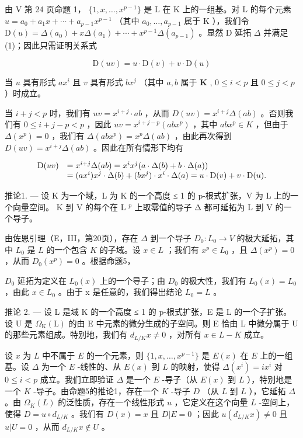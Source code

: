 由 V 第 24 页命题 1， \(\{1, x, \ldots, x^{p-1}\}\) 是 L 在 K 上的一组基。对 L 的每个元素 \(u = a_{0} + a_{1}x + \cdots + a_{p-1}x^{p-1}\) （其中 \(a_{0}, \ldots, a_{p-1}\) 属于 K ），我们令 \(\mathrm{D}(u) = \Delta(a_{0}) + x\Delta(a_{1}) + \cdots + x^{p-1}\Delta(a_{p-1})\) 。显然 D 延拓 \(\Delta\) 并满足 (1)；因此只需证明关系式

\[
\mathrm{D} (u v) = u \cdot \mathrm{D} (v) + v \cdot \mathrm{D} (u)
\]

当 \(u\) 具有形式 \(ax^i\) 且 \(v\) 具有形式 \(bx^j\) （其中 \(a, b\) 属于 \(\mathbf{K}\) , \(0 \leqslant i < p\) 且 \(0 \leqslant j < p\) ）时成立。

当 \(i + j < p\) 时，我们有 \(uv = x^{i + j} \cdot ab\) ，从而 \(D(uv) = x^{i + j}\Delta(ab)\) 。否则我们有 \(0 \leqslant i + j - p < p\) ，因此 \(uv = x^{i + j - p}(abx^p)\) ，其中 \(abx^p \in K\) ，但由于 \(\Delta(x^p) = 0\) ，我们有 \(\Delta(abx^p) = x^p\Delta(ab)\) ，由此再次得到 \(D(uv) = x^{i + j}\Delta(ab)\) 。因此在所有情形下均有

\[
\begin{array}{r l} \mathrm{D} (u v) & = x ^ {i + j} \Delta (a b) = x ^ {i} x ^ {j} (a \cdot \Delta (b) + b \cdot \Delta (a)) \\ & = (a x ^ {i}) x ^ {j} \cdot \Delta (b) + (b x ^ {j}) \cdot x ^ {i} \cdot \Delta (a) = u \cdot \mathrm{D} (v) + v \cdot \mathrm{D} (u). \end{array}
\]

推论1. --- 设 K 为一个域，L 为 K 的一个高度 ≤ 1 的 p-根式扩张，V 为 L 上的一个向量空间。 K 到 V 的每个在 L \(^{p}\) 上取零值的导子 Δ 都可延拓为 L 到 V 的一个导子。

由佐恩引理（E，III，第20页），存在 \(\Delta\) 到一个导子 \(D_0: L_0 \to V\) 的极大延拓，其中 \(L_0\) 是 \(L\) 的一个包含 \(K\) 的子域。设 \(x \in L\) ；我们有 \(x^p \in L_0\) ，且 \(\Delta(x^p) = 0\) ，从而 \(D_0(x^p) = 0\) 。根据命题5，

\(D_{0}\) 延拓为定义在 \(L_{0}(x)\) 上的一个导子；由 \(D_{0}\) 的极大性，我们有 \(L_{0}(x) = L_{0}\) ，由此 \(x \in L_{0}\) 。由于 x 是任意的，我们得出结论 \(L_{0} = L\) 。

推论 2. --- 设 L 是域 K 的一个高度 ≤ 1 的 p-根式扩张，E 是 L 的一个子扩张。设 U 是 \(\Omega_{\mathrm{K}}(\mathrm{L})\) 的由 E 中元素的微分生成的子空间。则 E 恰由 L 中微分属于 U 的那些元素组成。特别地，我们有 \(d_{L/K}x \neq 0\) ，对所有 \(x \in L - K\) 成立。

设 \(x\) 为 \(L\) 中不属于 \(E\) 的一个元素，则 \(\{1, x, \ldots, x^{p-1}\}\) 是 \(E(x)\) 在 \(E\) 上的一组基。设 \(\Delta\) 为一个 \(E\) -线性的、从 \(E(x)\) 到 \(L\) 的映射，使得 \(\Delta(x^i) = ix^i\) 对 \(0 \leqslant i < p\) 成立。我们立即验证 \(\Delta\) 是一个 \(E\) -导子（从 \(E(x)\) 到 \(L\) ），特别地是一个 \(K\) -导子。由命题5的推论1，存在一个 \(K\) -导子 \(D\) （从 \(L\) 到 \(L\) ），它延拓 \(\Delta\) 。由 \(\Omega_K(L)\) 的泛性质，存在一个线性形式 \(u\) ，它定义在这个向量 \(L\) -空间上，使得 \(D = u \circ d_{L/K}\) 。我们有 \(D(x) = x\) 且 \(D|E = 0\) ；因此 \(u(d_{L/K}x) \neq 0\) 且 \(u|U = 0\) ，从而 \(d_{L/K}x \notin U\) 。

